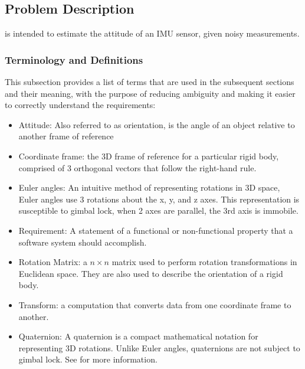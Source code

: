 \documentclass[12pt]{article}
\begin{document}
\subsection{Problem Description} \label{Sec_pd}

\progname{} is intended to estimate the attitude of an IMU sensor, given noisy measurements.


\subsubsection{Terminology and  Definitions}


This subsection provides a list of terms that are used in the subsequent sections and their meaning,
with the purpose of reducing ambiguity and making it easier to correctly understand the
requirements:

\begin{itemize}

\item Attitude: Also referred to as orientation, is the angle of an object relative to another frame
of reference
\item Coordinate frame: the 3D frame of reference for a particular rigid body, comprised of 3
orthogonal vectors that follow the right-hand rule.
\item Euler angles: An intuitive method of representing rotations in 3D space, Euler angles use 3
rotations about the x, y, and z axes. This representation is susceptible to gimbal lock, when 2 axes
are parallel, the 3rd axis is immobile.
\item Requirement: A statement of a functional or non-functional property that a software system
should accomplish.
\item Rotation Matrix: a $n \times n$ matrix used to perform rotation transformations in Euclidean
space. They are also used to describe the orientation of a rigid body.
\item Transform: a computation that converts data from one coordinate frame to another.
\item Quaternion: A quaternion is a compact mathematical notation for representing 3D rotations.
Unlike Euler angles, quaternions are not subject to gimbal lock. See \cite{quat} for more
information.
\end{itemize}
\end{document}
